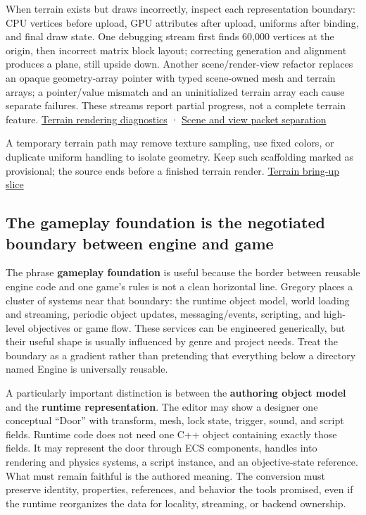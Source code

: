 When terrain exists but draws incorrectly, inspect each representation boundary: CPU vertices before upload, GPU attributes after upload, uniforms after binding, and final draw state. One debugging stream first finds 60,000 vertices at the origin, then incorrect matrix block layout; correcting generation and alignment produces a plane, still upside down. Another scene/render-view refactor replaces an opaque geometry-array pointer with typed scene-owned mesh and terrain arrays; a pointer/value mismatch and an uninitialized terrain array each cause separate failures. These streams report partial progress, not a complete terrain feature. \href{https://www.youtube.com/watch?v=N34cyDfZVtA}{Terrain rendering diagnostics} · \href{https://www.youtube.com/watch?v=JgMCoxs0nqo}{Scene and view packet separation}

A temporary terrain path may remove texture sampling, use fixed colors, or duplicate uniform handling to isolate geometry. Keep such scaffolding marked as provisional; the source ends before a finished terrain render. \href{https://www.youtube.com/watch?v=X9EYh-EfOz4}{Terrain bring-up slice}

\subsection{The gameplay foundation is the negotiated boundary between engine and game}\label{06-engine-ii-ch031-the-gameplay-foundation-is-the-negotiated-boundary-between-engine-and-game}

The phrase \textbf{gameplay foundation} is useful because the border between reusable engine code and one game's rules is not a clean horizontal line. Gregory places a cluster of systems near that boundary: the runtime object model, world loading and streaming, periodic object updates, messaging/events, scripting, and high-level objectives or game flow. These services can be engineered generically, but their useful shape is usually influenced by genre and project needs. Treat the boundary as a gradient rather than pretending that everything below a directory named Engine is universally reusable.

A particularly important distinction is between the \textbf{authoring object model} and the \textbf{runtime representation}. The editor may show a designer one conceptual ``Door'' with transform, mesh, lock state, trigger, sound, and script fields. Runtime code does not need one C++ object containing exactly those fields. It may represent the door through ECS components, handles into rendering and physics systems, a script instance, and an objective-state reference. What must remain faithful is the authored meaning. The conversion must preserve identity, properties, references, and behavior the tools promised, even if the runtime reorganizes the data for locality, streaming, or backend ownership.

